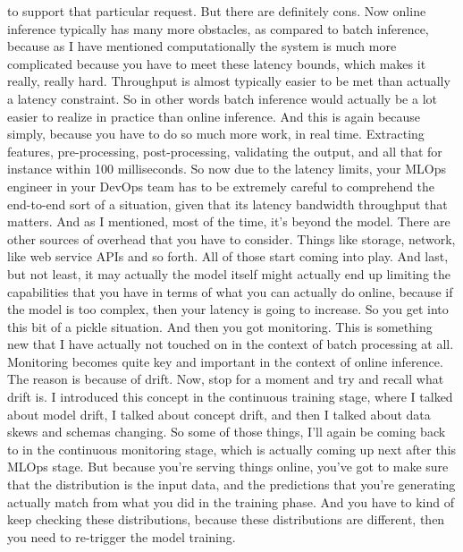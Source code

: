 {{{{{{{    to support that particular request.
    But there are definitely cons.
    Now online inference typically has many more obstacles,
    as compared to batch inference, because as I have mentioned computationally
    the system is much more complicated because you
    have to meet these latency bounds, which makes it really, really hard.
    Throughput is almost typically easier to be
    met than actually a latency constraint.
    So in other words batch inference would actually
    be a lot easier to realize in practice than online inference.
    And this is again because simply, because you have
    to do so much more work, in real time.
    Extracting features, pre-processing, post-processing,
    validating the output, and all that for instance within 100 milliseconds.
    So now due to the latency limits, your MLOps engineer in your DevOps team
    has to be extremely careful to comprehend
    the end-to-end sort of a situation, given that its latency bandwidth
    throughput that matters.
    And as I mentioned, most of the time, it's beyond the model.
    There are other sources of overhead that you have to consider.
    Things like storage, network, like web service APIs and so forth.
    All of those start coming into play.
    And last, but not least, it may actually the model itself might actually end up
    limiting the capabilities that you have in terms of what you can actually
    do online, because if the model is too complex,
    then your latency is going to increase.
    So you get into this bit of a pickle situation.
    And then you got monitoring.
    This is something new that I have actually
    not touched on in the context of batch processing at all.
    Monitoring becomes quite key and important
    in the context of online inference.
    The reason is because of drift.
    Now, stop for a moment and try and recall what drift is.
    I introduced this concept in the continuous training stage,
    where I talked about model drift, I talked about concept drift,
    and then I talked about data skews and schemas changing.
    So some of those things, I'll again be coming back to
    in the continuous monitoring stage, which is actually
    coming up next after this MLOps stage.
    But because you're serving things online,
    you've got to make sure that the distribution is the input data,
    and the predictions that you're generating actually
    match from what you did in the training phase.
    And you have to kind of keep checking these distributions,
    because these distributions are different,
    then you need to re-trigger the model training.
}}}}}}}
